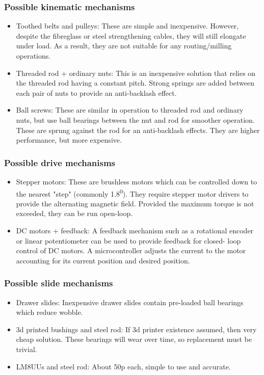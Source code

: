 \subsubsection{Possible kinematic mechanisms}
\begin{itemize}
	\item	Toothed belts and pulleys: These are simple and inexpensive. However, despite the fibreglass or steel strengthening cables, they will
			still elongate under load. As a result, they are not suitable for any routing/milling operations.
	\item	Threaded rod + ordinary nuts: This is an inexpensive solution that relies on the threaded rod having a constant pitch. Strong springs 
			are added between each pair of nuts to provide an anti-backlash effect.
	\item	Ball screws: These are similar in operation to threaded rod and ordinary nuts, but use ball bearings between the nut and rod for smoother
			operation. These are sprung against the rod for an anti-backlash effects. They are higher performance, but more expensive.
\end{itemize}

\subsubsection{Possible drive mechanisms}
\begin{itemize}
	\item	Stepper motors: These are brushless motors which can be controlled down to the nearest "step" (commonly 1.8\textsuperscript{0}). They require
			stepper motor drivers to provide the alternating magnetic field. Provided the maximum torque is not exceeded, they can be run open-loop.
	\item	DC motors + feedback: A feedback mechanism such as a rotational encoder or linear potentiometer can be used to provide feedback for closed-
			loop control of DC motors. A microcontroller adjusts the current to the motor accounting for its current position and desired position.
\end{itemize}

\subsubsection{Possible slide mechanisms}
\begin{itemize}
	\item	Drawer slides: Inexpensive drawer slides contain pre-loaded ball bearings which reduce wobble.
	\item	3d printed bushings and steel rod: If 3d printer existence assumed, then very cheap solution. These bearings
			will wear over time, so replacement must be trivial.
	\item	LM8UUs and steel rod: About 50p each, simple to use and accurate.
\end{itemize}


